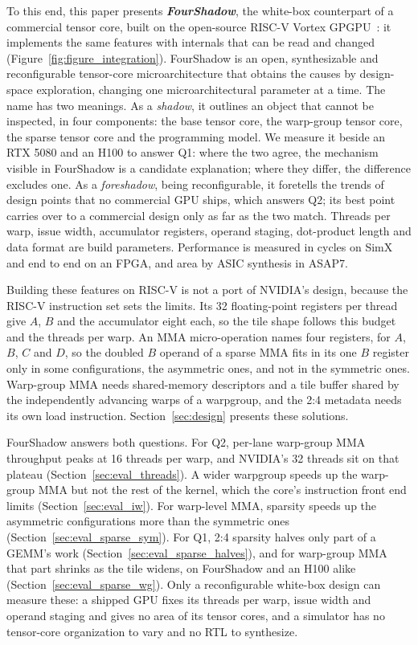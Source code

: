 To this end, this paper presents \textit{\textbf{FourShadow}}, the white-box counterpart of a commercial tensor core, built on the open-source RISC-V Vortex GPGPU~\cite{vortex}: it implements the same features with internals that can be read and changed (Figure~\ref{fig:figure_integration}). FourShadow is an open, synthesizable and reconfigurable tensor-core microarchitecture that obtains the causes by design-space exploration, changing one microarchitectural parameter at a time. The name has two meanings. As a \emph{shadow}, it outlines an object that cannot be inspected, in four components: the base tensor core, the warp-group tensor core, the sparse tensor core and the programming model. We measure it beside an RTX 5080 and an H100 to answer Q1: where the two agree, the mechanism visible in FourShadow is a candidate explanation; where they differ, the difference excludes one. As a \emph{foreshadow}, being reconfigurable, it foretells the trends of design points that no commercial GPU ships, which answers Q2; its best point carries over to a commercial design only as far as the two match. Threads per warp, issue width, accumulator registers, operand staging, dot-product length and data format are build parameters. Performance is measured in cycles on SimX and end to end on an FPGA, and area by ASIC synthesis in ASAP7.

Building these features on RISC-V is not a port of NVIDIA's design, because the RISC-V instruction set sets the limits. Its 32 floating-point registers per thread give $A$, $B$ and the accumulator eight each, so the tile shape follows this budget and the threads per warp. An MMA micro-operation names four registers, for $A$, $B$, $C$ and $D$, so the doubled $B$ operand of a sparse MMA fits in its one $B$ register only in some configurations, the asymmetric ones, and not in the symmetric ones. Warp-group MMA needs shared-memory descriptors and a tile buffer shared by the independently advancing warps of a warpgroup, and the 2:4 metadata needs its own load instruction. Section~\ref{sec:design} presents these solutions.

FourShadow answers both questions. For Q2, per-lane warp-group MMA throughput peaks at 16 threads per warp, and NVIDIA's 32 threads sit on that plateau (Section~\ref{sec:eval_threads}).
A wider warpgroup speeds up the warp-group MMA but not the rest of the kernel, which the core's instruction front end limits (Section~\ref{sec:eval_iw}). For warp-level MMA, sparsity speeds up the asymmetric configurations more than the symmetric ones (Section~\ref{sec:eval_sparse_sym}). For Q1, 2:4 sparsity halves only part of a GEMM's work (Section~\ref{sec:eval_sparse_halves}), and for warp-group MMA that part shrinks as the tile widens, on FourShadow and an H100 alike (Section~\ref{sec:eval_sparse_wg}). Only a reconfigurable white-box design can measure these: a shipped GPU fixes its threads per warp, issue width and operand staging and gives no area of its tensor cores, and a simulator has no tensor-core organization to vary and no RTL to synthesize.

